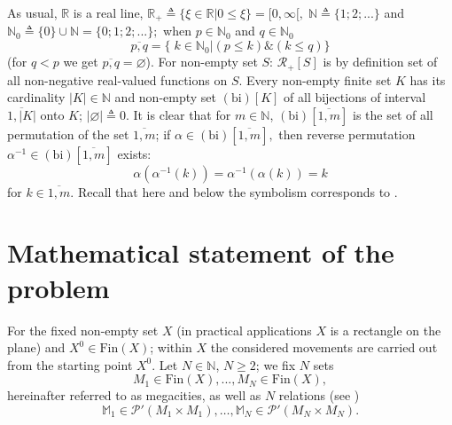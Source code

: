 \documentclass[10pt]{article}
\begin{document}
As usual,
$\mathbb{R}$ is a real line,
$\mathbb{R}_+ {\triangleq} \{\xi \in \mathbb{R} \vert 0 \le \xi\} = [0,\infty[,\;\mathbb{N} {\triangleq} \{1;2;...\}$
and $\mathbb{N}_0 {\triangleq} \{0\} \cup \mathbb{N} = \{0;1;2;...\};$
when $p \in \mathbb{N}_0$
and $q \in \mathbb{N}_0$
$$
\overline{p,q} = \{\;k \in \mathbb{N}_0 \vert (p \le k) \& (k \le q)\}
$$
(for $q < p$ we get $\overline{p,q} = \varnothing$).
For non-empty set
$S$:
$\mathcal{R}_+[S]$
is
by definition
set of all non-negative real-valued functions on
$S$.
Every non-empty finite set $K$
has its cardinality
$|K| \in \mathbb{N}$
and non-empty set $(\mathrm{bi})[K]$
of all bijections
\cite[ с.87]{17}
of interval
$\overline{1,|K|}$
onto $K$;
$|\varnothing| {\triangleq} 0$.
It is clear that for
$m \in \mathbb{N}$,
$(\mathrm{bi})[\overline{1,m}]$
is the set of all permutation
\cite[ с.87]{17}
of the set
$\overline{1,m}$;
if
$\alpha \in (\mathrm{bi})[\overline{1,m}],$
then reverse permutation
$\alpha^{-1} \in (\mathrm{bi})[\overline{1,m}]$
exists:
$$
    \alpha(\alpha^{-1}(k)) = \alpha^{-1}(\alpha(k)) = k
$$
for $k \in \overline{1,m}.$
Recall that here and below the symbolism corresponds to
\cite[$\S$3.1]{4}.

\section{Mathematical statement of the problem}
\label{sec:2}

For the fixed non-empty set
$X$
(in practical applications
\cite{4}
$X$
is a rectangle on the plane)
and $X^0 \in \mathrm{Fin}(X)$;
within $ X $ the considered movements are carried out
from the starting point
$ X ^ 0 $.
Let $N \in \mathbb{N}$,
$N\ge 2$;
we fix $N$ sets
\begin{equation}\label{2.1}
M_1 \in \mathrm{Fin}(X),...,M_N \in \mathrm{Fin}(X),
\end{equation}
hereinafter referred to as megacities,
as well as
$N$
relations
(see \cite[chapter II,$\S$4]{15})
\begin{equation}\label{2.2}
\mathbb{M}_1 \in \mathcal{P}'(M_1 \times M_1), \dots ,
    \mathbb{M}_N \in \mathcal{P}'(M_N \times M_N).
\end{equation}
\end{document}

